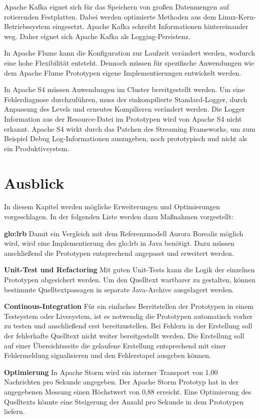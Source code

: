 Apache Kafka eignet sich für das Speichern von großen Datenmengen auf rotierenden Festplatten. Dabei werden optimierte Methoden aus dem Linux-Kern-Betriebssystem eingesetzt. Apache Kafka schreibt Informationen hintereinander weg. Daher eignet sich Apache Kafka als Logging-Persistenz.

In Apache Flume kann die Konfiguration zur Laufzeit verändert werden, wodurch eine hohe Flexibilität entsteht. Dennoch müssen für spezifische Anwendungen wie dem Apache Flume Prototypen eigene Implementierungen entwickelt werden. 

In Apache S4 müssen Anwendungen im Cluster bereitgestellt werden. Um eine Fehlerdiagnose durchzuführen, muss der einkompilierte Standard-Logger, durch Anpassung des Levels und erneutes Kompilieren verändert werden. Die Logger Information aus der Resource-Datei im Prototypen wird von Apache S4 nicht erkannt. Apache S4 wirkt durch das Patchen des Streaming Frameworks, um zum Beispiel Debug Log-Informationen auszugeben, noch prototypisch und nicht als ein Produktivsystem.


\section{Ausblick}

In diesem Kapitel werden mögliche Erweiterungen und Optimierungen vorgeschlagen. In der folgenden Liste werden dazu Maßnahmen  vorgestellt:

\textbf{\gls{glo:lrb}}
Damit ein Vergleich mit dem Referenzmodell Aurora Borealis möglich wird, wird eine Implementierung des \gls{glo:lrb} in Java benötigt. Dazu müssen anschließend die Prototypen entsprechend angepasst und erweitert werden.

\textbf{Unit-Test und Refactoring}
Mit guten Unit-Tests kann die Logik der einzelnen Prototypen abgesichert werden. Um den Quelltext wartbarer zu gestalten, können bestimmte Quelltextpassagen in separate Java-Archive ausgelagert werden.

\textbf{Continous-Integration}
Für ein einfaches Bereitstellen der Prototypen in einem Testsystem oder Livesystem, ist es notwendig die Prototypen automatisch vorher zu testen und anschließend erst bereitzustellen. Bei Fehlern in der Erstellung soll der fehlerhafte Quelltext nicht weiter bereitgestellt werden. Die Erstellung soll auf einer Übersichtsseite die gelaufene Erstellung entsprechend mit einer Fehlermeldung signalisieren und den Fehlerstapel ausgeben können.

\textbf{Optimierung}
In Apache Storm wird ein interner Transport von 1,00 Nachrichten pro Sekunde angegeben. Der Apache Storm Prototyp hat in der angegebenen Messung einen Höchstwert von 0,88 erreicht. Eine Optimierung des Quelltexts könnte eine Steigerung der Anzahl pro Sekunde in dem Prototypen liefern.


